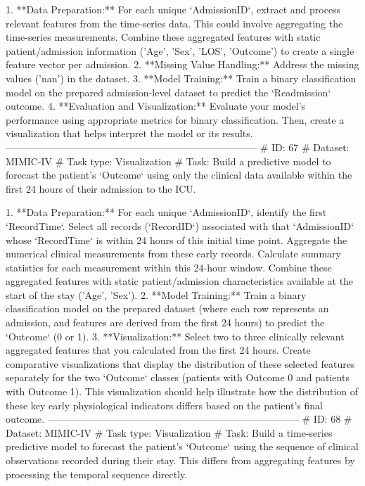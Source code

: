 \begin{tcolorbox}[colback=cadmiumgreen!5!white,colframe=forestgreen!75!white,breakable,title=\textit{Generated analytical tasks in task 4.}]
\begin{VerbatimWrap}
 1. **Data Preparation:** For each unique `AdmissionID`, extract and process relevant features from the time-series data. This could involve aggregating the time-series measurements. Combine these aggregated features with static patient/admission information ('Age', 'Sex', 'LOS', 'Outcome') to create a single feature vector per admission.
 2. **Missing Value Handling:** Address the missing values ('nan') in the dataset.
 3. **Model Training:** Train a binary classification model on the prepared admission-level dataset to predict the `Readmission` outcome.
 4. **Evaluation and Visualization:** Evaluate your model's performance using appropriate metrics for binary classification. Then, create a visualization that helps interpret the model or its results.
-----------------------------------------------------------------------------
# ID: 67  
# Dataset: MIMIC-IV 
# Task type: Visualization
# Task: Build a predictive model to forecast the patient's `Outcome` using only the clinical data available within the first 24 hours of their admission to the ICU.
 
 1. **Data Preparation:** For each unique `AdmissionID`, identify the first `RecordTime`. Select all records (`RecordID`) associated with that `AdmissionID` whose `RecordTime` is within 24 hours of this initial time point. Aggregate the numerical clinical measurements from these early records. Calculate summary statistics for each measurement within this 24-hour window. Combine these aggregated features with static patient/admission characteristics available at the start of the stay ('Age', 'Sex'). 
 2. **Model Training:** Train a binary classification model on the prepared dataset (where each row represents an admission, and features are derived from the first 24 hours) to predict the `Outcome` (0 or 1).
 3. **Visualization:** Select two to three clinically relevant aggregated features that you calculated from the first 24 hours. Create comparative visualizations that display the distribution of these selected features separately for the two `Outcome` classes (patients with Outcome 0 and patients with Outcome 1). This visualization should help illustrate how the distribution of these key early physiological indicators differs based on the patient's final outcome.
-----------------------------------------------------------------------------
# ID: 68  
# Dataset: MIMIC-IV 
# Task type: Visualization
# Task: Build a time-series predictive model to forecast the patient's `Outcome` using the sequence of clinical observations recorded during their stay. This differs from aggregating features by processing the temporal sequence directly.
 

\end{VerbatimWrap}
\end{tcolorbox}
